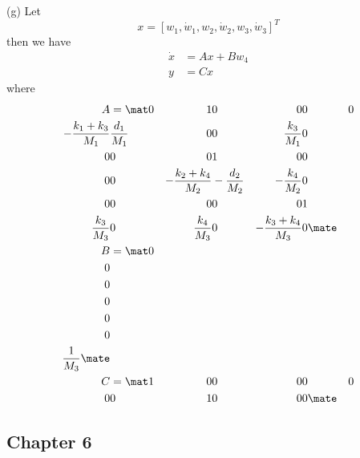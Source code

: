 (g) Let
\begin{equation}
    x = [w_1, \dot{w}_1, w_2, \dot{w}_2, w_3, \dot{w}_3]^T
\end{equation}
then we have
\begin{align}
    \dot{x} &= Ax + Bw_4 \\
    y &= Cx
\end{align}
where
\begin{align}
    A &= \mat 0 &1 &0 &0 &0 &0 \\ -\frac{k_1+k_3}{M_1} &\frac{d_1}{M_1} &0 &0 &\frac{k_3}{M_1} &0 \\ 0 &0 &0 &1 &0 &0 \\ 0 &0 &-\frac{k_2+k_4}{M_2} &-\frac{d_2}{M_2} &-\frac{k_4}{M_2} &0 \\ 0 &0 &0 &0 &0 &1 \\ \frac{k_3}{M_3} &0 &\frac{k_4}{M_3} &0 &-\frac{k_3+k_4}{M_3} &0 \mate \\
    B &= \mat 0 \\ 0 \\ 0 \\ 0 \\ 0 \\ 0 \\ \frac{1}{M_3} \mate \\
    C &= \mat 1 &0 &0 &0 &0 &0 \\ 0 &0 &1 &0 &0 &0 \mate
\end{align}


\subsection{Chapter 6}

